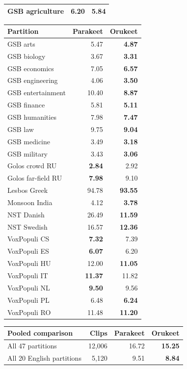 \begin{table}[!p]
\begin{minipage}[t]{0.49\linewidth}
\begin{tabular}{lrr}
GSB agriculture & 6.20 & \textbf{5.84}\\
\bottomrule
\end{tabular}
\end{minipage}\hfill%
\begin{minipage}[t]{0.49\linewidth}
\vspace{0pt}
\centering
\setlength{\tabcolsep}{3pt}
\renewcommand{\arraystretch}{1.10}
\begin{tabular}{lrr}
\toprule
Partition & Parakeet & Orukeet\\
\midrule
GSB arts & 5.47 & \textbf{4.87}\\
GSB biology & 3.67 & \textbf{3.31}\\
GSB economics & 7.05 & \textbf{6.57}\\
GSB engineering & 4.06 & \textbf{3.50}\\
GSB entertainment & 10.40 & \textbf{8.87}\\
GSB finance & 5.81 & \textbf{5.11}\\
GSB humanities & 7.98 & \textbf{7.47}\\
GSB law & 9.75 & \textbf{9.04}\\
GSB medicine & 3.49 & \textbf{3.18}\\
GSB military & 3.43 & \textbf{3.06}\\
Golos crowd RU & \textbf{2.84} & 2.92\\
Golos far-field RU & \textbf{7.98} & 9.10\\
Lesbos Greek & 94.78 & \textbf{93.55}\\
Monsoon India & 4.12 & \textbf{3.78}\\
NST Danish & 26.49 & \textbf{11.59}\\
NST Swedish & 16.57 & \textbf{12.36}\\
VoxPopuli CS & \textbf{7.32} & 7.39\\
VoxPopuli ES & \textbf{6.07} & 6.20\\
VoxPopuli HU & 12.00 & \textbf{11.05}\\
VoxPopuli IT & \textbf{11.37} & 11.82\\
VoxPopuli NL & \textbf{9.50} & 9.56\\
VoxPopuli PL & 6.48 & \textbf{6.24}\\
VoxPopuli RO & 11.48 & \textbf{11.20}\\
\bottomrule
\end{tabular}
\end{minipage}
\par\vspace{12pt}
\begin{tabular}{lrrr}
\toprule
Pooled comparison & Clips & Parakeet & Orukeet\\
\midrule
All 47 partitions & 12,006 & 16.72 & \textbf{15.25}\\
All 20 English partitions & 5,120 & 9.51 & \textbf{8.84}\\
\bottomrule
\end{tabular}
\end{table}
